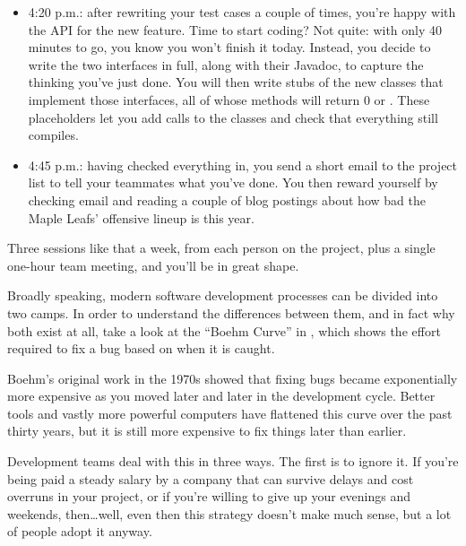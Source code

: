 \documentclass{report}
\begin{document}
\begin{itemize}
  \item 4:20 p.m.: after rewriting your test cases a couple of times,
  you're happy with the API for the new feature.  Time to start
  coding?  Not quite: with only 40 minutes to go, you know you won't
  finish it today.  Instead, you decide to write the two interfaces in
  full, along with their Javadoc, to capture the thinking you've just
  done.  You will then write stubs of the new classes that implement
  those interfaces, all of whose methods will return 0 or .
  These placeholders let you add calls to the classes and check that
  everything still compiles.

  \item 4:45 p.m.: having checked everything in, you send a short
  email to the project list to tell your teammates what you've done.
  You then reward yourself by checking email and reading a couple of
  blog postings about how bad the Maple Leafs' offensive lineup is
  this year.

\end{itemize}

Three sessions like that a week, from each person on the project, plus
a single one-hour team meeting, and you'll be in great shape.


Broadly speaking, modern software development processes can be divided
into two camps.  In order to understand the differences between them,
and in fact why both exist at all, take a look at the ``Boehm Curve''
in , which shows the effort required to fix a
bug based on when it is caught.

\begin{figure}
\end{figure}

Boehm's original work in the 1970s showed that fixing bugs became
exponentially more expensive as you moved later and later in the
development cycle.  Better tools and vastly more powerful computers
have flattened this curve over the past thirty years, but it is still
more expensive to fix things later than earlier.

Development teams deal with this in three ways. The first is to ignore
it.  If you're being paid a steady salary by a company that can
survive delays and cost overruns in your project, or if you're willing
to give up your evenings and weekends, then{\ldots}well, even then
this strategy doesn't make much sense, but a lot of people adopt it
anyway.
\end{document}
